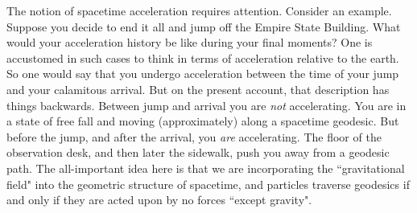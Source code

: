 \documentclass [12] {article}
\theoremstyle{plain}
\numberwithin{figure}{subsection}
\numberwithin{proposition}{subsection}
\begin{document}
The notion of spacetime acceleration requires attention. Consider an example. Suppose you decide to end it all and jump  off the Empire State Building.  What would your acceleration  history be like during your  final moments?  One is  accustomed in such cases to think in terms of acceleration relative to the earth.  So one would  say that you undergo acceleration between the time of your jump and your calamitous arrival. But on the present account, that description has things backwards.  Between jump and arrival you are \emph{not} accelerating. You are in a state of free fall and moving (approximately) along a spacetime geodesic. But before the jump, and after the arrival, you \emph{are} accelerating. The floor of the observation desk, and then later the sidewalk, push you away from a geodesic  path.  The all-important idea here is  that we are incorporating the ``gravitational field" into the geometric structure of spacetime, and particles traverse geodesics if and only if they are acted upon by no forces ``except gravity".

%
%
\end{document}
